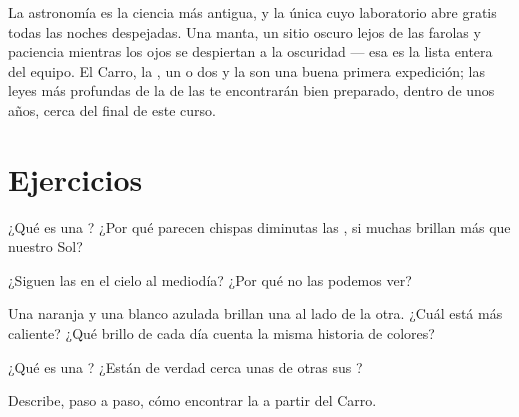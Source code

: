 \begin{remark}\label{rem:g5:stars-night-sky:lookup}
La astronomía es la ciencia más antigua, y la única cuyo laboratorio
abre gratis todas las noches despejadas. Una manta, un sitio oscuro
lejos de las farolas y paciencia mientras los ojos se despiertan a la
oscuridad --- esa es la lista entera del equipo. El Carro, la
, un  o dos y la  son una
buena primera expedición; las leyes más profundas de la  de las
 te encontrarán bien preparado, dentro de unos años, cerca
del final de este curso.
\end{remark}

\section{Ejercicios}

\begin{exercise}[$\star$]\label{exo:g5:stars-night-sky:1}
¿Qué es una ? ¿Por qué parecen chispas diminutas las
, si muchas brillan más que nuestro Sol?
\end{exercise}

\begin{exercise}[$\star$]\label{exo:g5:stars-night-sky:2}
¿Siguen las  en el cielo al mediodía? ¿Por qué no las podemos
ver?
\end{exercise}

\begin{exercise}[$\star$]\label{exo:g5:stars-night-sky:3}
Una  naranja y una  blanco azulada brillan una al
lado de la otra. ¿Cuál está más caliente? ¿Qué brillo de cada día
cuenta la misma historia de colores?
\end{exercise}

\begin{exercise}[$\star$]\label{exo:g5:stars-night-sky:4}
¿Qué es una ? ¿Están de verdad cerca unas de otras sus
?
\end{exercise}

\begin{exercise}[$\star$]\label{exo:g5:stars-night-sky:5}
Describe, paso a paso, cómo encontrar la  a partir del
Carro.
\end{exercise}

